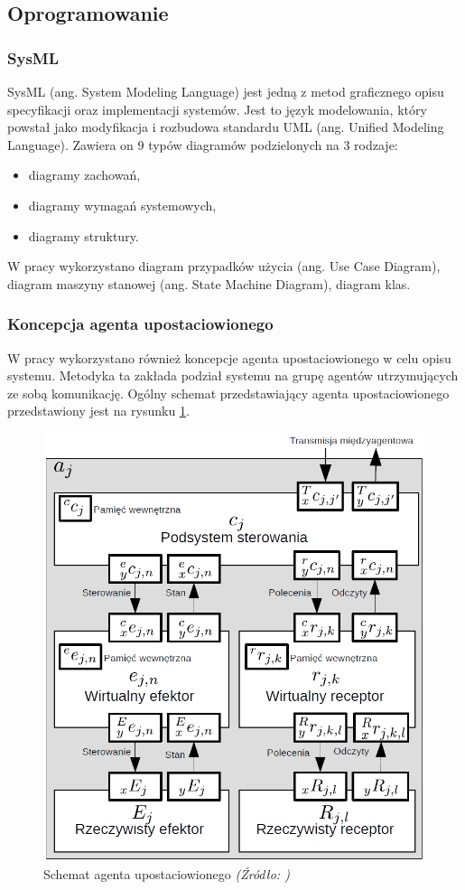 \documentclass[a4paper, 12pt, twoside]{article}
\begin{document}
\subsection{Oprogramowanie}

\subsubsection{SysML}

SysML (ang. System Modeling Language)\cite{sysml} jest jedną z metod graficznego opisu specyfikacji oraz implementacji systemów. Jest to język modelowania, który powstał jako modyfikacja i rozbudowa standardu UML (ang. Unified Modeling Language). Zawiera on 9 typów diagramów podzielonych na 3 rodzaje: 
\begin{itemize}
\item diagramy zachowań,
\item diagramy wymagań systemowych,
\item diagramy struktury.
\end{itemize}

W pracy wykorzystano diagram przypadków użycia (ang. Use Case Diagram), diagram maszyny stanowej (ang. State Machine Diagram), diagram klas. 

\subsubsection{Koncepcja agenta upostaciowionego}

W pracy wykorzystano również koncepcje agenta upostaciowionego \cite{embodiedagent} w celu opisu systemu. Metodyka ta zakłada podział systemu na grupę agentów utrzymujących ze sobą komunikację. Ogólny schemat przedstawiający agenta upostaciowionego przedstawiony jest na rysunku \ref{fig:embodied_agent}.

\begin{figure}[hbt!]
\centering
\includegraphics[width=0.6\linewidth]{images/embodied_agent.png}
\caption{Schemat agenta upostaciowionego \textit{ (Źródło: \cite{thesiswegierek}) } }
\label{fig:embodied_agent}
\end{figure}
\end{document}

